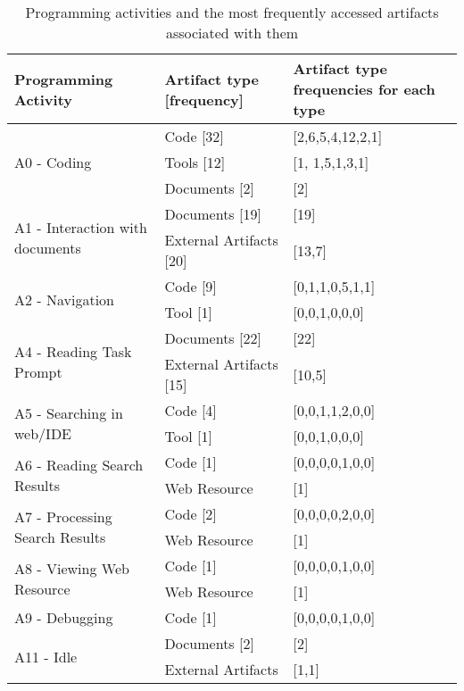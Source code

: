 
\begin{table*}
\caption{Programming activities and the most frequently accessed artifacts associated with them}
\label{tab:programming-activities}
\begin{tabular}{lll}
\toprule
Programming Activity & Artifact type [frequency] & Artifact type frequencies for each type \\
\midrule
\multirow{3}{*}{A0 - Coding} & Code [32] & [2,6,5,4,12,2,1] \\
& Tools [12] & [1, 1,5,1,3,1] \\
& Documents [2] & [2] \\
\midrule
\multirow{2}{*}{A1 - Interaction with documents} & Documents [19] & [19] \\
& External Artifacts [20] & [13,7] \\
\midrule
\multirow{2}{*}{A2 - Navigation} & Code [9] & [0,1,1,0,5,1,1] \\
& Tool [1] & [0,0,1,0,0,0] \\
\midrule
\multirow{2}{*}{A4 - Reading Task Prompt} & Documents [22] & [22] \\
& External Artifacts [15] & [10,5] \\
\midrule
\multirow{2}{*}{A5 - Searching in web/IDE} & Code [4] & [0,0,1,1,2,0,0] \\
& Tool [1] & [0,0,1,0,0,0] \\
\midrule
\multirow{2}{*}{A6 - Reading Search Results} & Code [1] & [0,0,0,0,1,0,0] \\
& Web Resource & [1] \\
\midrule
\multirow{2}{*}{A7 - Processing Search Results} & Code [2] & [0,0,0,0,2,0,0] \\
& Web Resource & [1] \\
\midrule
\multirow{2}{*}{A8 - Viewing Web Resource} & Code [1] & [0,0,0,0,1,0,0] \\
& Web Resource & [1] \\
\midrule
A9 - Debugging & Code [1] & [0,0,0,0,1,0,0] \\
\midrule
\multirow{2}{*}{A11 - Idle} & Documents [2] & [2] \\
& External Artifacts & [1,1] \\
\bottomrule
\end{tabular}
\end{table*}